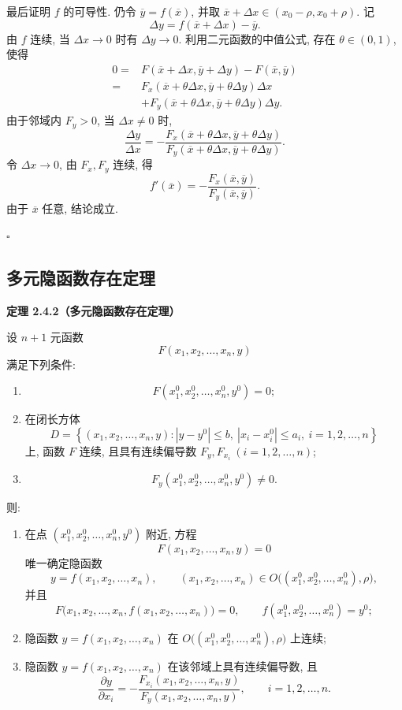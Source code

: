 	

	最后证明 $f$ 的可导性. 仍令
	$\overline y=f(\overline x)$, 并取
	$\overline x+\Delta x\in(x_0-\rho,x_0+\rho)$. 记
	\[
	\Delta y=f(\overline x+\Delta x)-\overline y.
	\]
	由 $f$ 连续, 当 $\Delta x\to0$ 时有 $\Delta y\to0$.
	利用二元函数的中值公式, 存在 $\theta\in(0,1)$, 使得
	\[
	\begin{aligned}
	0
	={}&F(\overline x+\Delta x,\overline y+\Delta y)-F(\overline x,\overline y)\\
	={}&F_x(\overline x+\theta\Delta x,\overline y+\theta\Delta y)\Delta x\\
	&+F_y(\overline x+\theta\Delta x,\overline y+\theta\Delta y)\Delta y.
	\end{aligned}
	\]
	由于邻域内 $F_y>0$, 当 $\Delta x\ne0$ 时,
	\[
	\frac{\Delta y}{\Delta x}
	=
	-\frac{
	F_x(\overline x+\theta\Delta x,\overline y+\theta\Delta y)}
	{F_y(\overline x+\theta\Delta x,\overline y+\theta\Delta y)}.
	\]
	令 $\Delta x\to0$, 由 $F_x,F_y$ 连续, 得
	\[
	f'(\overline x)
	=
	-\frac{F_x(\overline x,\overline y)}{F_y(\overline x,\overline y)}.
	\]
	由于 $\overline x$ 任意, 结论成立.


$\square$


\subsection*{多元隐函数存在定理}


\textbf{定理 2.4.2（多元隐函数存在定理）}


	设 $n+1$ 元函数
	\[
	F(x_1,x_2,\ldots,x_n,y)
	\]
	满足下列条件:
	\begin{enumerate}
		\item
		\[
		F(x_1^0,x_2^0,\ldots,x_n^0,y^0)=0;
		\]
		\item 在闭长方体
		\[
		D=
		\left\{
		(x_1,x_2,\ldots,x_n,y):
		|y-y^0|\le b,\ 
		|x_i-x_i^0|\le a_i,\ i=1,2,\ldots,n
		\right\}
		\]
		上, 函数 $F$ 连续, 且具有连续偏导数
		$F_y,F_{x_i}\ (i=1,2,\ldots,n)$;
		\item
		\[
		F_y(x_1^0,x_2^0,\ldots,x_n^0,y^0)\ne0.
		\]
	\end{enumerate}
	则:
	\begin{enumerate}
		\item[(i)] 在点 $(x_1^0,x_2^0,\ldots,x_n^0,y^0)$ 附近,
		方程
		\[
		F(x_1,x_2,\ldots,x_n,y)=0
		\]
		唯一确定隐函数
		\[
		y=f(x_1,x_2,\ldots,x_n),
		\qquad
		(x_1,x_2,\ldots,x_n)
		\in O\bigl((x_1^0,x_2^0,\ldots,x_n^0),\rho\bigr),
		\]
		并且
		\[
		F\bigl(x_1,x_2,\ldots,x_n,
		f(x_1,x_2,\ldots,x_n)\bigr)=0,
		\qquad
		f(x_1^0,x_2^0,\ldots,x_n^0)=y^0;
		\]
		\item[(ii)] 隐函数 $y=f(x_1,x_2,\ldots,x_n)$
		在 $O\bigl((x_1^0,x_2^0,\ldots,x_n^0),\rho\bigr)$ 上连续;
		\item[(iii)] 隐函数 $y=f(x_1,x_2,\ldots,x_n)$
		在该邻域上具有连续偏导数, 且
		\[
		\frac{\partial y}{\partial x_i}
		=
		-\frac{F_{x_i}(x_1,x_2,\ldots,x_n,y)}
		{F_y(x_1,x_2,\ldots,x_n,y)},
		\qquad i=1,2,\ldots,n.
		\]
	\end{enumerate}




